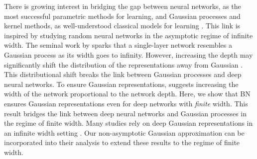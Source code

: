There is growing interest in bridging the gap between neural networks, as the most successful parametric methods for learning, and Gaussian processes and kernel methods, as well-understood classical models for learning \citep{jacot2018neural,matthews2018gaussian,lee2017deep,bietti2019inductive,huang2014kernel}. This link is inspired by studying random neural networks in the asymptotic regime of infinite width. The seminal work by \cite{neal2012bayesian} sparks that a single-layer network resembles a Gaussian process as its width goes to infinity. However, increasing the depth may significantly shift the distribution of the representations away from Gaussian \citep{ioffe2015batch}. This distributional shift breaks the link between Gaussian processes and deep neural networks. To ensure Gaussian representations,  \cite{matthews2018gaussian} suggests increasing the width of the network proportional to the network depth. Here, we show that BN ensures Gaussian representations even for deep networks with \textit{finite} width. This result bridges the link between deep neural networks and Gaussian processes in the regime of finite width. Many studies rely on deep Gaussian representations in an infinite width setting \citep{yang2018a,schoenholz2016deep,pennington2018emergence,klambauer2017self,de2018random}. Our non-asymptotic Gaussian approximation can be incorporated into their analysis to extend these results to the regime of finite width.


